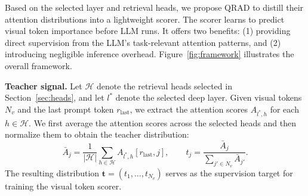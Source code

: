 Based on the selected layer and retrieval heads, we propose QRAD to distill their attention distributions into a lightweight scorer. The scorer learns to predict visual token importance before LLM runs. It offers two benefits: (1) providing direct supervision from the LLM's task-relevant attention patterns, and (2) introducing negligible inference overhead. Figure~\ref{fig:framework} illustrates the overall framework.

\textbf{Teacher signal.}
Let $\mathcal{H}$ denote the retrieval heads selected in Section~\ref{sec:heads}, and let $l^*$ denote the selected deep layer. Given visual tokens $N_v$ and the last prompt token $r_{\mathrm{last}}$, we extract the attention scores $A_{l^*,h}$ for each $h\in\mathcal{H}$. We first average the attention scores across the selected heads and then normalize them to obtain the teacher distribution:
\begin{equation}
\bar A_j=\frac{1}{|\mathcal{H}|}\sum_{h\in\mathcal{H}}A_{l^*,h}[r_{\mathrm{last}},j],
\qquad
t_j=\frac{\bar A_j}{\sum\limits_{j'\in N_v}\bar A_{j'}}.
\label{eq:teacher}
\end{equation}
The resulting distribution ${\mathbf{t}}=(t_1,\ldots,t_{N_v})$ serves as the supervision target for training the visual token scorer.

